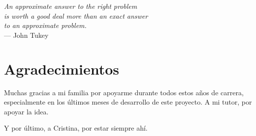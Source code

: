 

\begin{flushright}{\slshape
    An approximate answer to the right problem \\
    is worth a good deal more than an exact answer\\
    to an approximate problem.} \\ \medskip
    --- John Tukey
\end{flushright}


\bigskip

\begingroup
\let\clearpage\relax
\let\cleardoublepage\relax
\let\cleardoublepage\relax
\chapter*{Agradecimientos}

Muchas gracias a mi familia por apoyarme durante todos estos años de carrera,
especialmente en los últimos meses de desarrollo de este proyecto. A mi tutor,
por apoyar la idea.

\bigskip

Y por último, a Cristina, por estar siempre ahí.

\endgroup



